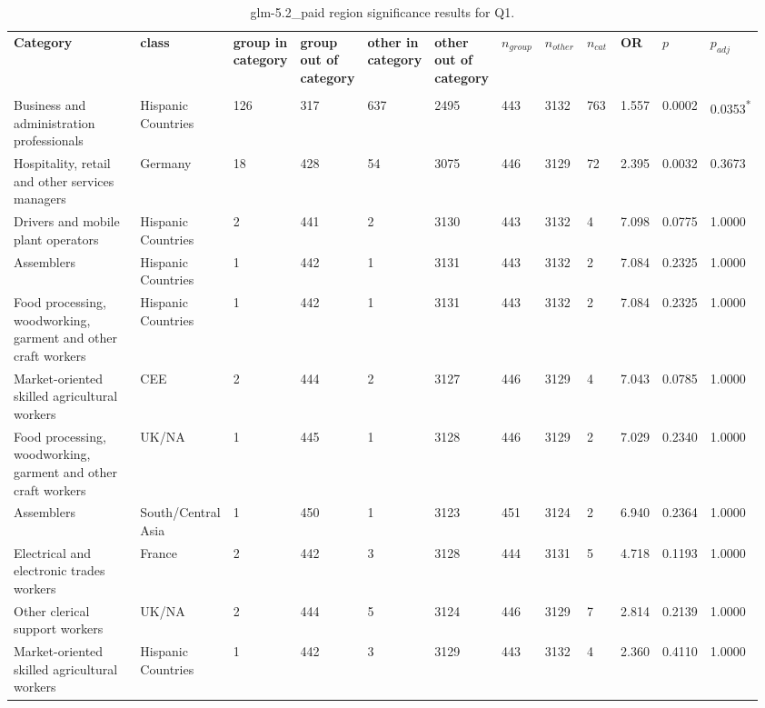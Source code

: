\clearpage
\begin{landscape}
\begin{table}[p]
\centering
\caption{glm-5.2_paid region significance results for Q1.}
\label{tab:appendix-q1-glm-5.2_paid-region}
\scriptsize
\renewcommand{\arraystretch}{0.92}
\setlength{\tabcolsep}{2pt}
\begin{tabular}{p{0.35\linewidth}p{0.1\linewidth}p{0.05\linewidth}p{0.05\linewidth}p{0.05\linewidth}p{0.05\linewidth}p{0.05\linewidth}p{0.05\linewidth}p{0.05\linewidth}p{0.05\linewidth}p{0.05\linewidth}p{0.06\linewidth}}
\toprule
\textbf{Category} & \textbf{class} & \textbf{group in category} & \textbf{group out of category} & \textbf{other in category} & \textbf{other out of category} & \textbf{$n_{group}$} & \textbf{$n_{other}$} & \textbf{$n_{cat}$} & \textbf{OR} & \textbf{$p$} & \textbf{$p_{adj}$} \\\\
\midrule
Business and administration professionals & Hispanic Countries & 126 & 317 & 637 & 2495 & 443 & 3132 & 763 & 1.557 & 0.0002 & 0.0353\textsuperscript{*} \\
Hospitality, retail and other services managers & Germany & 18 & 428 & 54 & 3075 & 446 & 3129 & 72 & 2.395 & 0.0032 & 0.3673 \\
Drivers and mobile plant operators & Hispanic Countries & 2 & 441 & 2 & 3130 & 443 & 3132 & 4 & 7.098 & 0.0775 & 1.0000 \\
Assemblers & Hispanic Countries & 1 & 442 & 1 & 3131 & 443 & 3132 & 2 & 7.084 & 0.2325 & 1.0000 \\
Food processing, woodworking, garment and other craft workers & Hispanic Countries & 1 & 442 & 1 & 3131 & 443 & 3132 & 2 & 7.084 & 0.2325 & 1.0000 \\
Market-oriented skilled agricultural workers & CEE & 2 & 444 & 2 & 3127 & 446 & 3129 & 4 & 7.043 & 0.0785 & 1.0000 \\
Food processing, woodworking, garment and other craft workers & UK/NA & 1 & 445 & 1 & 3128 & 446 & 3129 & 2 & 7.029 & 0.2340 & 1.0000 \\
Assemblers & South/Central Asia & 1 & 450 & 1 & 3123 & 451 & 3124 & 2 & 6.940 & 0.2364 & 1.0000 \\
Electrical and electronic trades workers & France & 2 & 442 & 3 & 3128 & 444 & 3131 & 5 & 4.718 & 0.1193 & 1.0000 \\
Other clerical support workers & UK/NA & 2 & 444 & 5 & 3124 & 446 & 3129 & 7 & 2.814 & 0.2139 & 1.0000 \\
Market-oriented skilled agricultural workers & Hispanic Countries & 1 & 442 & 3 & 3129 & 443 & 3132 & 4 & 2.360 & 0.4110 & 1.0000 \\

\end{tabular}
\end{table}
\end{landscape}
